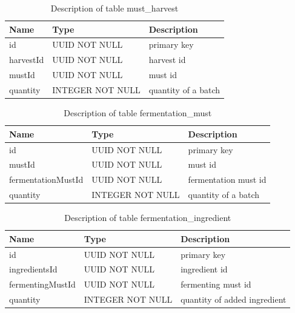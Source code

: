 \begin{table}[th]
	\centering
	\caption{Description of table must\_harvest}
	\begin{tabular}{|m{}|m{}|m{}|}
		\hline
		Name & Type & Description \\ \hline
		id & UUID NOT NULL & primary key\\ \hline
		harvestId & UUID NOT NULL & harvest id\\ \hline
		mustId & UUID NOT NULL & must id\\ \hline
		quantity & INTEGER NOT NULL & quantity of a batch\\ \hline
	\end{tabular}
\end{table}

\begin{table}[th]
	\centering
	\caption{Description of table fermentation\_must}
	\begin{tabular}{|m{}|m{}|m{}|}
		\hline
		Name & Type & Description \\ \hline
		id & UUID NOT NULL & primary key\\ \hline
		mustId & UUID NOT NULL & must id\\ \hline
		fermentationMustId & UUID NOT NULL & fermentation must id\\ \hline
		quantity & INTEGER NOT NULL & quantity of a batch\\ \hline
	\end{tabular}
\end{table}

\begin{table}[th]
	\centering
	\caption{Description of table fermentation\_ingredient}
	\begin{tabular}{|m{}|m{}|m{}|}
		\hline
		Name & Type & Description \\ \hline
		id & UUID NOT NULL & primary key\\ \hline
		ingredientsId & UUID NOT NULL & ingredient id\\ \hline
		fermentingMustId & UUID NOT NULL & fermenting must id\\ \hline
		quantity & INTEGER NOT NULL & quantity of added ingredient\\ \hline
	\end{tabular}
\end{table}

